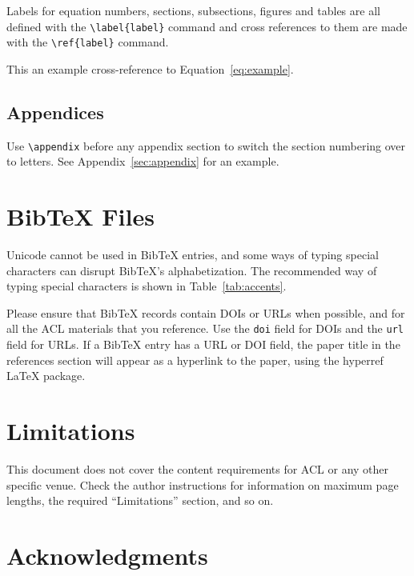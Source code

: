 Labels for equation numbers, sections, subsections, figures and tables
are all defined with the \verb|\label{label}| command and cross references
to them are made with the \verb|\ref{label}| command.

This an example cross-reference to Equation~\ref{eq:example}.

\subsection{Appendices}

Use \verb|\appendix| before any appendix section to switch the section numbering over to letters. See Appendix~\ref{sec:appendix} for an example.

\section{Bib\TeX{} Files}
\label{sec:bibtex}

Unicode cannot be used in Bib\TeX{} entries, and some ways of typing special characters can disrupt Bib\TeX's alphabetization. The recommended way of typing special characters is shown in Table~\ref{tab:accents}.

Please ensure that Bib\TeX{} records contain DOIs or URLs when possible, and for all the ACL materials that you reference.
Use the \verb|doi| field for DOIs and the \verb|url| field for URLs.
If a Bib\TeX{} entry has a URL or DOI field, the paper title in the references section will appear as a hyperlink to the paper, using the hyperref \LaTeX{} package.

\section*{Limitations}

This document does not cover the content requirements for ACL or any
other specific venue.  Check the author instructions for
information on
maximum page lengths, the required ``Limitations'' section,
and so on.

\section*{Acknowledgments}

